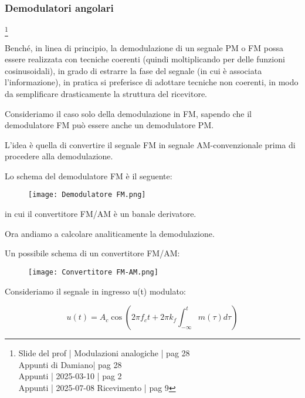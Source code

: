 \newpage 

\subsubsection{Demodulatori angolari}
\footnote{Slide del prof | Modulazioni analogiche | pag 28 \\  
Appunti di Damiano| pag 28 \\
Appunti | 2025-03-10 | pag 2 \\
Appunti | 2025-07-08 Ricevimento | pag 9
} 

Benché, in linea di principio, la demodulazione di un segnale PM o FM possa essere realizzata con tecniche coerenti (quindi moltiplicando per delle funzioni cosinusoidali), 
in grado di estrarre la fase del segnale (in cui è associata l'informazione), 
in pratica si preferisce di adottare tecniche non coerenti, in modo da semplificare drasticamente la struttura del ricevitore. \newline 

Consideriamo il caso solo della demodulazione in FM, sapendo che il demodulatore FM può essere anche un demodulatore PM. \newline 

L'idea è quella di convertire il segnale FM in segnale AM-convenzionale prima di procedere alla demodulazione. \newline 

Lo schema del demodulatore FM è il seguente: 

\begin{figure}[h]
    \centering
    \texttt{[image: Demodulatore FM.png]}
\end{figure}

in cui il convertitore FM/AM è un banale derivatore. \newline 

Ora andiamo a calcolare analiticamente la demodulazione. \newline 

Un possibile schema di un convertitore FM/AM: 

\begin{figure}[h]
    \centering
    \texttt{[image: Convertitore FM-AM.png]}
\end{figure}

Consideriamo il segnale in ingresso u(t) modulato: 

{
    \Large 
    \begin{equation}
        u(t)
        = 
        A_c 
        \cos 
        \left(
            2 \pi f_c t 
            + 
            2 \pi k_f \int_{- \infty}^{t} m(\tau) d\tau
        \right)
    \end{equation}
}

